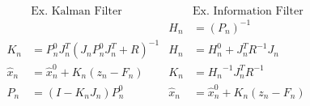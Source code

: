 \begin{algorithm}[t]
\begin{gather*}
\begin{aligned}
&\text{Ex. Kalman Filter}                           &       &\text{Ex. Information Filter} \\
&                                                   &       H_n &= \left(P_n\right)^{-1} \\
K_n &= P_n^0 J_n^T(J_n P_n^0 J_n^T + R)^{-1}        &       H_n &= H_n^0 + J_n^T R^{-1} J_n \\
\hat{x}_n &= \hat{x}_n^0 + K_n(z_n - F_n)           &       K_n &= {H_n}^{-1} J_n^T R^{-1} \\
P_n &= (I - K_n J_n)P_n^0                           &       \hat{x}_n &= \hat{x}_n^0 + K_n (z_n - F_n)
\end{aligned}
\end{gather*}
\caption{
% 
% 
Analogy of EKF and EIF.
% 
% 
}
\label{tab:eif}
\end{algorithm}